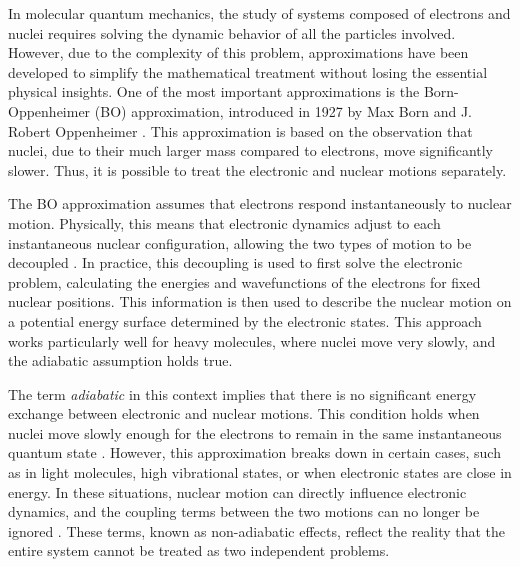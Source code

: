\documentclass[%
 reprint,
 amsmath,amssymb,
 aps,
]{revtex4-2}
\begin{document}

In molecular quantum mechanics, the study of systems composed of electrons and nuclei requires solving the dynamic behavior of all the particles involved. However, due to the complexity of this problem, approximations have been developed to simplify the mathematical treatment without losing the essential physical insights. One of the most important approximations is the Born-Oppenheimer (BO) approximation, introduced in 1927 by Max Born and J. Robert Oppenheimer \cite{born1927}. This approximation is based on the observation that nuclei, due to their much larger mass compared to electrons, move significantly slower. Thus, it is possible to treat the electronic and nuclear motions separately.

The BO approximation assumes that electrons respond instantaneously to nuclear motion. Physically, this means that electronic dynamics adjust to each instantaneous nuclear configuration, allowing the two types of motion to be decoupled \cite{born1954dynamical}. In practice, this decoupling is used to first solve the electronic problem, calculating the energies and wavefunctions of the electrons for fixed nuclear positions. This information is then used to describe the nuclear motion on a potential energy surface determined by the electronic states. This approach works particularly well for heavy molecules, where nuclei move very slowly, and the adiabatic assumption holds true.

The term \emph{adiabatic} in this context implies that there is no significant energy exchange between electronic and nuclear motions. This condition holds when nuclei move slowly enough for the electrons to remain in the same instantaneous quantum state \cite{stanke2013relativistic}. However, this approximation breaks down in certain cases, such as in light molecules, high vibrational states, or when electronic states are close in energy. In these situations, nuclear motion can directly influence electronic dynamics, and the coupling terms between the two motions can no longer be ignored \cite{pachucki2010molecular}. These terms, known as non-adiabatic effects, reflect the reality that the entire system cannot be treated as two independent problems.
\end{document}
